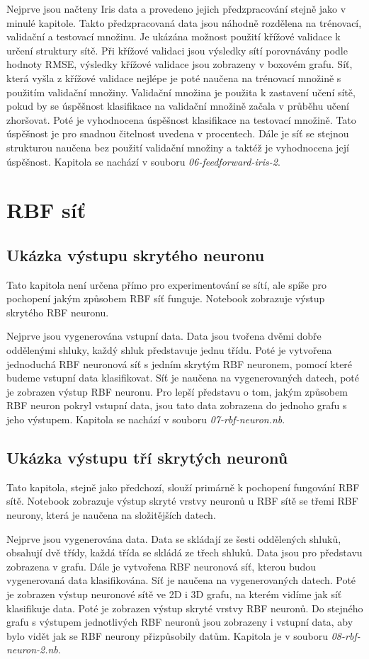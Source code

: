 \documentclass[11pt,twoside,a4paper]{book}
\begin{document}
Nejprve jsou načteny Iris data a provedeno jejich předzpracování stejně jako v minulé kapitole. Takto předzpracovaná data jsou náhodně rozdělena na trénovací, validační a testovací množinu. Je ukázána možnost použití křížové validace k určení struktury sítě. Při křížové validaci jsou výsledky sítí porovnávány podle hodnoty RMSE, výsledky křížové validace jsou zobrazeny v boxovém grafu. Síť, která vyšla z křížové validace nejlépe je poté naučena na trénovací množině s použitím validační množiny. Validační množina je použita k zastavení učení sítě, pokud by se úspěšnost klasifikace na validační množině začala v průběhu učení zhoršovat. Poté je vyhodnocena úspěšnost klasifikace na testovací množině. Tato úspěšnost je pro snadnou čitelnost uvedena v procentech. Dále je síť se stejnou strukturou naučena bez použití validační množiny a taktéž je vyhodnocena její úspěšnost. Kapitola se nachází v souboru \textit{06-feedforward-iris-2}.
\section{RBF síť}
\subsection{Ukázka výstupu skrytého neuronu}
Tato kapitola není určena přímo pro experimentování se sítí, ale spíše pro pochopení jakým způsobem RBF síť funguje. Notebook zobrazuje výstup skrytého RBF neuronu.

Nejprve jsou vygenerována vstupní data. Data jsou tvořena dvěmi dobře oddělenými shluky, každý shluk představuje jednu třídu. Poté je vytvořena jednoduchá RBF neuronová síť s jedním skrytým RBF neuronem, pomocí které budeme vstupní data klasifikovat. Síť je naučena na vygenerovaných datech, poté je zobrazen výstup RBF neuronu. Pro lepší představu o tom, jakým způsobem RBF neuron pokryl vstupní data, jsou tato data zobrazena do jednoho grafu s jeho výstupem. Kapitola se nachází v souboru \textit{07-rbf-neuron.nb}.
\subsection{Ukázka výstupu tří skrytých neuronů}
Tato kapitola, stejně jako předchozí, slouží primárně k pochopení fungování RBF sítě. Notebook zobrazuje výstup skryté vrstvy neuronů u RBF sítě se třemi RBF neurony, která je naučena na složitějších datech. 

Nejprve jsou vygenerována data. Data se skládají ze šesti oddělených shluků, obsahují dvě třídy, každá třída se skládá ze třech shluků. Data jsou pro představu zobrazena v grafu. Dále je vytvořena RBF neuronová síť, kterou budou vygenerovaná data klasifikována. Síť je naučena na vygenerovaných datech. Poté je zobrazen výstup neuronové sítě ve 2D i 3D grafu, na kterém vidíme jak síť klasifikuje data. Poté je zobrazen výstup skryté vrstvy RBF neuronů. Do stejného grafu s výstupem jednotlivých RBF neuronů jsou zobrazeny i vstupní data, aby bylo vidět jak se RBF neurony přizpůsobily datům. Kapitola je v souboru \textit{08-rbf-neuron-2.nb}.
\end{document}
